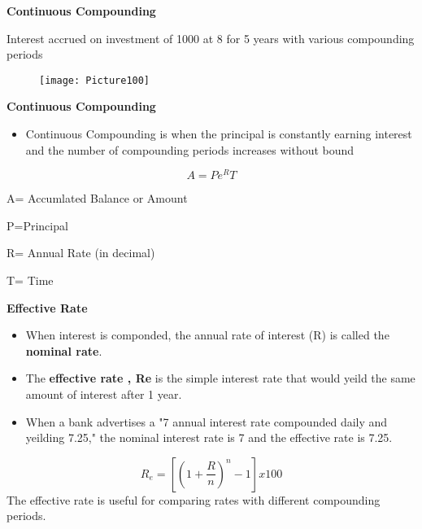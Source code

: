 \documentclass{article}
\begin{document}
\newpage
\begin{center}
	\textbf{Continuous Compounding}
\end{center}

	Interest accrued on investment of 1000 at 8 for 5 years with various compounding periods 
	
\begin{figure}[h!]
	\texttt{[image: Picture100]}
\end{figure}

\begin{center}
	\textbf{Continuous Compounding}
\end{center}
\begin{itemize}
	\item Continuous Compounding is when the principal is constantly earning interest and the number of compounding periods increases without bound
\end{itemize}
\begin{center}
	
	\begin{equation}
	A=Pe^RT
	\end{equation}
\end{center}
\begin{flushright}
	A= Accumlated Balance or Amount
	
	P=Principal
	
	R= Annual Rate (in decimal)
	
	T= Time
	
\end{flushright}

\newpage
\begin{center}
	\textbf{Effective Rate}
\end{center}
\begin{itemize}
	\item When interest is componded, the annual rate of interest (R) is called the \textbf{nominal rate}.
	
	\item The \textbf{effective rate , Re} is the simple interest rate that would yeild the same amount of interest after 1 year.
	
	\item When a bank advertises a "7  annual interest rate compounded daily and yeilding 7.25," the nominal interest rate is 7 and the effective rate is 7.25.
	
	\end{itemize}
\begin{equation}
R_{e}=[(1 + \frac{R}{n})^n - 1] x 100
\end{equation}
The effective rate is useful for comparing rates with different compounding periods.
\end{document}
